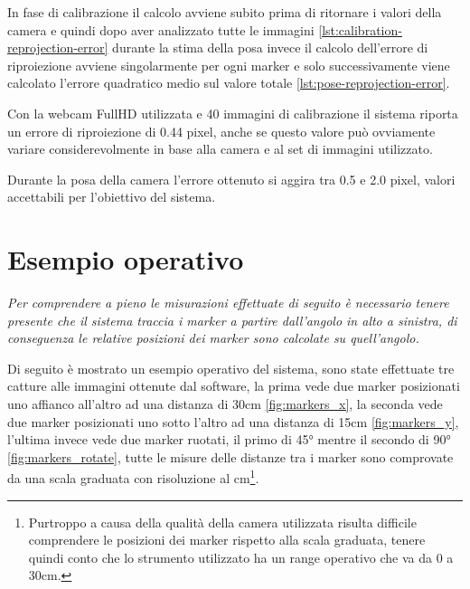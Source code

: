 \documentclass[12pt,a4paper,openright,twoside]{book}
\begin{document}
In fase di calibrazione il calcolo avviene subito prima di ritornare i valori della camera e quindi dopo aver analizzato tutte le immagini \cref{lst:calibration-reprojection-error}
durante la stima della posa invece il calcolo dell'errore di riproiezione avviene singolarmente per ogni marker e solo successivamente viene calcolato l'errore quadratico medio sul valore totale \cref{lst:pose-reprojection-error}.

Con la webcam FullHD utilizzata e 40 immagini di calibrazione il sistema riporta un errore di riproiezione di 0.44 pixel, anche se questo valore può ovviamente variare considerevolmente in base alla camera e al set di immagini utilizzato.

Durante la posa della camera l'errore ottenuto si aggira tra 0.5 e 2.0 pixel, valori accettabili per l'obiettivo del sistema.



\section{Esempio operativo} \label{sec:esempio_operativo}
\textit{Per comprendere a pieno le misurazioni effettuate di seguito è necessario tenere presente che il sistema traccia i marker a partire dall'angolo in alto a sinistra, di conseguenza le relative posizioni dei marker sono calcolate su quell'angolo.}
\vspace{0.5cm}

Di seguito è mostrato un esempio operativo del sistema, sono state effettuate tre catture alle immagini ottenute dal software, la prima vede due marker posizionati uno affianco all'altro ad una distanza di 30cm \ref{fig:markers_x}, la seconda vede due marker posizionati uno sotto l'altro ad una distanza di 15cm \ref{fig:markers_y}, l'ultima invece vede due marker ruotati, il primo di 45° mentre il secondo di 90° \ref{fig:markers_rotate}, tutte le misure delle distanze tra i marker sono comprovate da una scala graduata con risoluzione al cm\footnote{Purtroppo a causa della qualità della camera utilizzata risulta difficile comprendere le posizioni dei marker rispetto alla scala graduata, tenere quindi conto che lo strumento utilizzato ha un range operativo che va da 0 a 30cm.}.
\end{document}
